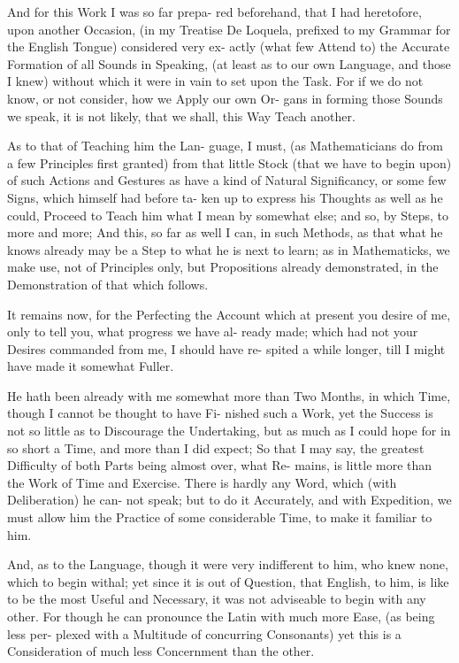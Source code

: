 And for this Work I was so far prepa-
red beforehand, that I had heretofore,
upon another Occasion, (in my Treatise
De Loquela, prefixed to my Grammar for
the English Tongue) considered very ex-
actly (what few Attend to) the Accurate
Formation of all Sounds in Speaking, (at
least as to our own Language, and those I
knew) without which it were in vain to
set upon the Task. For if we do not know,
or not consider, how we Apply our own Or-
gans in forming those Sounds we speak, it
is not likely, that we shall, this Way Teach
another.

As to that of Teaching him the Lan-
guage, I must, (as Mathematicians do
from a few Principles first granted) from
that little Stock (that we have to begin
upon) of such Actions and Gestures as have
a kind of Natural Significancy, or some
few Signs, which himself had before ta-
ken up to express his Thoughts as well as
he could, Proceed to Teach him what I
mean by somewhat else; and so, by Steps,
to more and more; And this, so far as
well I can, in such Methods, as that what
he knows already may be a Step to what
he is next to learn; as in Mathematicks,
we make use, not of Principles only, but
Propositions already demonstrated, in the
Demonstration of that which follows.

It remains now, for the Perfecting the
Account which at present you desire of me,
only to tell you, what progress we have al-
ready made; which had not your Desires
commanded from me, I should have re-
spited a while longer, till I might have
made it somewhat Fuller.

He hath been already with me somewhat
more than Two Months, in which Time,
though I cannot be thought to have Fi-
nished such a Work, yet the Success is not
so little as to Discourage the Undertaking,
but as much as I could hope for in so short
a Time, and more than I did expect; So
that I may say, the greatest Difficulty of
both Parts being almost over, what Re-
mains, is little more than the Work of
Time and Exercise. There is hardly any
Word, which (with Deliberation) he can-
not speak; but to do it Accurately, and
with Expedition, we must allow him the
Practice of some considerable Time, to
make it familiar to him.

And, as to the Language, though it were
very indifferent to him, who knew none,
which to begin withal; yet since it is out
of Question, that English, to him, is like
to be the most Useful and Necessary, it
was not adviseable to begin with any other.
For though he can pronounce the Latin
with much more Ease, (as being less per-
plexed with a Multitude of concurring
Consonants) yet this is a Consideration of
much less Concernment than the other.

